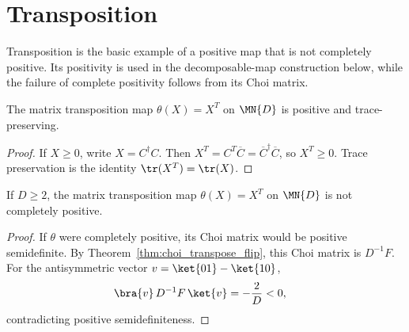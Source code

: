 \section{Transposition}

Transposition is the basic example of a positive map that is not completely
positive. Its positivity is used in the decomposable-map construction below,
while the failure of complete positivity follows from its Choi matrix.

\begin{theorem}
    \label{thm:transpose_positive_trace_preserving}
    \leanok
    The matrix transposition map $\theta(X)=X^T$ on $\MN{D}$ is positive
    and trace-preserving.
\end{theorem}

\begin{proof}\leanok
    If $X \ge 0$, write $X=C^\dagger C$. Then
    $X^T=C^T\overline C=\overline C^\dagger\overline C$, so $X^T \ge 0$.
    Trace preservation is the identity $\tr(X^T)=\tr(X)$.
\end{proof}

\begin{theorem}
    \label{thm:transpose_not_completely_positive}
    \leanok
    If $D \ge 2$, the matrix transposition map $\theta(X)=X^T$ on $\MN{D}$
    is not completely positive.
\end{theorem}

\begin{proof}\leanok
    If $\theta$ were completely positive, its Choi matrix would be positive
    semidefinite. By Theorem~\ref{thm:choi_transpose_flip}, this Choi matrix is
    $D^{-1}F$. For the antisymmetric vector
    $v=\ket{01}-\ket{10}$,
    \begin{align}
        \bra{v}\,D^{-1}F\,\ket{v}
         & =-\frac{2}{D}<0,
        \notag
    \end{align}
    contradicting positive semidefiniteness.
\end{proof}

